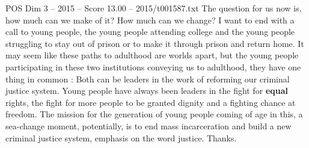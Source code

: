 \begin{textsample}{POS Dim 3 – 2015 – Score 13.00 – 2015/t001587.txt}
The question for us now is, how much can we make of it?
How much can we change?
I want to end with a call to young people, the young people attending college and the young people struggling to stay out of prison or to make it through prison and return home.
It may seem like these paths to adulthood are worlds apart, but the young people participating in these two institutions conveying us to adulthood, they have one thing in common : Both can be leaders in the work of reforming our criminal justice system.
Young people have always been leaders in the fight for \textbf{equal} rights, the fight for more people to be granted dignity and a fighting chance at freedom.
The mission for the generation of young people coming of age in this, a sea-change moment, potentially, is to end mass incarceration and build a new criminal justice system, emphasis on the word justice.
Thanks.

\end{textsample}
